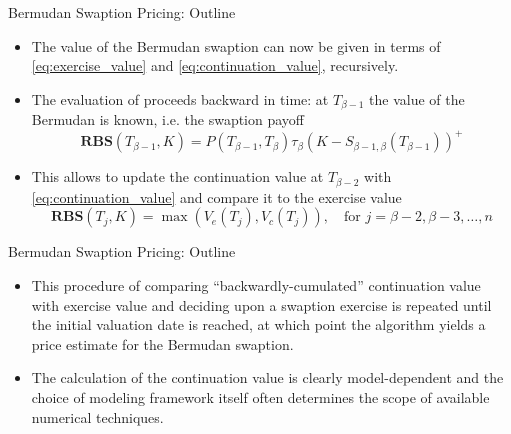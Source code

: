 \documentclass{beamer}
\begin{document}
\begin{frame}{Bermudan Swaption Pricing: Outline}
	\begin{itemize}
		\item The value of the Bermudan swaption can now be given in terms of \cref{eq:exercise_value} and \cref{eq:continuation_value}, recursively.
		\item The evaluation of proceeds backward in time: at $T_{\beta-1}$
		the value of the Bermudan is known, i.e. the swaption payoff
		\begin{equation*}
			\textbf{RBS}(T_{\beta-1},K)=P(T_{\beta-1},T_\beta)\tau_\beta(K-S_{\beta-1,\beta}(T_{\beta-1}))^+
		\end{equation*}
		\item This allows to update the continuation value at $T_{\beta-2}$ with \cref{eq:continuation_value} and compare it to the exercise value
		\begin{equation*}
			\textbf{RBS}(T_j,K)=\max(V_e(T_j),V_c(T_j)),\quad\text{for }j=\beta-2,\beta-3,\ldots,n
		\end{equation*}
	\end{itemize}
\end{frame}

\begin{frame}{Bermudan Swaption Pricing: Outline}
	\begin{itemize}
		\item This procedure of comparing “backwardly-cumulated” continuation value with exercise value and deciding upon a swaption exercise is repeated until the initial valuation date is reached, at which point the algorithm yields a price estimate for the Bermudan swaption. 
		\item The calculation of the continuation value is clearly model-dependent and the choice of modeling framework itself often determines the scope of available numerical techniques.
\end{itemize}
\end{frame}
\end{document}
